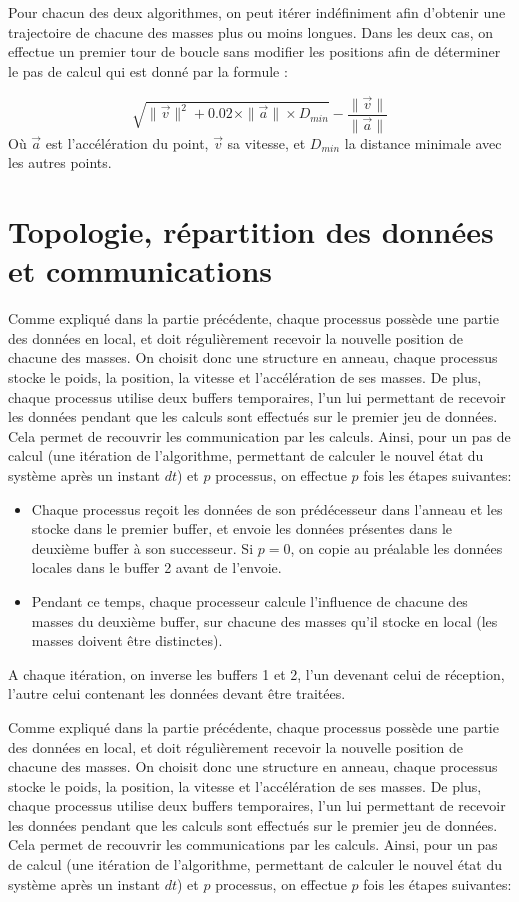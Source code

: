 \documentclass[a4paper,11pt]{article}
\begin{document}
Pour chacun des deux algorithmes, on peut itérer indéfiniment afin d'obtenir une trajectoire de chacune des masses plus ou moins longues. Dans les deux cas, on effectue un premier tour de boucle sans modifier les positions afin de déterminer le pas de calcul qui est donné par la formule :

\[
\sqrt{\|\vec{v}\|^2 + 0.02 \times \|\vec{a}\| \times \mathit{D_{min}}} - \frac{\| \vec{v}\|}{\| \vec{a} \|}
\] 
Où $\vec{a}$ est l'accélération du point, $\vec{v}$ sa vitesse, et $\mathit{D_{min}}$ la distance minimale avec les autres points.




\section{Topologie, répartition des données et communications}

Comme expliqué dans la partie précédente, chaque processus possède une partie des données en local, et doit régulièrement recevoir la nouvelle position de chacune des masses. On choisit donc une structure en anneau, chaque processus stocke le poids, la position, la vitesse et l'accélération de ses masses. De plus, chaque processus utilise deux buffers temporaires, l'un lui permettant de recevoir les données pendant que les calculs sont effectués sur le premier jeu de données. Cela permet de recouvrir les communication par les calculs. Ainsi, pour un pas de calcul (une itération de l'algorithme, permettant de calculer le nouvel état du système après un instant $dt$) et $p$ processus, on effectue $p$ fois les étapes suivantes:
\begin{itemize}
\item Chaque processus reçoit les données de son prédécesseur dans l'anneau et les stocke dans le premier buffer, et envoie les données présentes dans le deuxième buffer à son successeur. Si $p = 0$, on copie au préalable les données locales dans le buffer 2 avant de l'envoie.
\item Pendant ce temps, chaque processeur calcule l'influence de chacune des masses du deuxième buffer, sur chacune des masses qu'il stocke en local (les masses doivent être distinctes).
\end{itemize}
 A chaque itération, on inverse les buffers 1 et 2, l'un devenant celui de réception, l'autre celui contenant les données devant être traitées.

Comme expliqué dans la partie précédente, chaque processus possède une partie des données en local, et doit régulièrement recevoir la nouvelle position de chacune des masses. On choisit donc une structure en anneau, chaque processus stocke le poids, la position, la vitesse et l'accélération de ses masses. De plus, chaque processus utilise deux buffers temporaires, l'un lui permettant de recevoir les données pendant que les calculs sont effectués sur le premier jeu de données. Cela permet de recouvrir les communications par les calculs. Ainsi, pour un pas de calcul (une itération de l'algorithme, permettant de calculer le nouvel état du système après un instant $dt$) et $p$ processus, on effectue $p$ fois les étapes suivantes:
\end{document}
